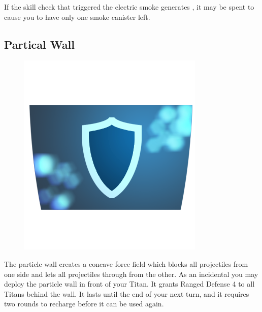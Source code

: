\documentclass[9pt, openany]{extbook}
\begin{document}
If the skill check that triggered the electric smoke generates \Advantage\Advantage, it may be spent to cause you to have only one smoke canister left.

\subsection{Partical Wall}
\begin{figure}
\vspace*{-4em}
\includegraphics[width=\linewidth]{ParticleWall}
\end{figure}

The particle wall creates a concave force field which blocks all projectiles from one side and lets all projectiles through from the other. As an incidental you may deploy the particle wall in front of your Titan. It grants Ranged Defense 4 to all Titans behind the wall. It lasts until the end of your next turn, and it requires two rounds to recharge before it can be used again.
\end{document}
